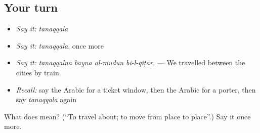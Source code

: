 \subsection*{Your turn}
\begin{itemize}
\raggedright
  \item \emph{Say it:} \emph{tanaqqala}
  \item \emph{Say it:} \emph{tanaqqala}, once more
  \item \emph{Say it:} \emph{tanaqqalnā bayna al-mudun bi-l-qiṭār.} — We travelled between the cities by train.
  \item \emph{Recall:} say the Arabic for a ticket window, then the Arabic for a porter, then say \emph{tanaqqala} again
\end{itemize}

\begin{tcolorbox}[breakable,colback=teal!4,colframe=teal!35!black,title={Before you move on}]
What does  mean? (\textquotedblleft{}To travel about; to move from place to place\textquotedblright{}.) Say it once more.
\end{tcolorbox}
